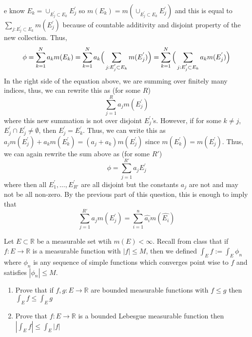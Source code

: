 \documentclass[12pt]{article}
\newcommand{\R}{\mathbb{R}}
\newenvironment{solution}[2][Solution]{\begin{trivlist}
\item[\hskip \labelsep {\bfseries #1}]}{\end{trivlist}}
\newenvironment{problem}[2][Problem]{\begin{trivlist}
\item[\hskip \labelsep {\bfseries #1}\hskip \labelsep {\bfseries #2.}]}{\end{trivlist}}
\begin{document}
\begin{solution}
    We know $E_k = \cup_{E_j^{'}\subset E_k} E_j^{'}$ so $m(E_k) = m(\cup_{E_j^{'}\subset E_k} E_j^{'})$ and this is equal to
    $\sum_{j:E_j^{'}\subset E_k} m(E_j^{'})$ because of countable additivity and disjoint property of the new collection. Thus,
    \[ \phi = \sum_{k=1}^{N} a_km(E_k) = \sum_{k=1}^{N} a_k\Big{(}\sum_{j: E_j^{'}\subset E_k} m(E_j^{'})\Big{)} 
        = \sum_{k=1}^N \Big{(}\sum_{j: E_j^{'}\subset E_k} a_km(E_j^{'})\Big{)}\]
    In the right side of the equation above, we are summing over finitely many indices, thus, we can rewrite this as (for some $R$)
    \[ \sum_{j=1}^R a_jm(E_j^{'}) \]
    where this new summation is not over disjoint $E_j^{'}$'s. However, if for some $k\neq j$, $E_j^{'}\cap E_j^{'}\neq\emptyset$,
    then $E_j^{'} = E_k^{'}$. Thus, we can write this as $a_jm(E_j^{'}) + a_km(E_k^{'}) = (a_j + a_k)m(E_j^{'})$ 
    since $m(E_k^{'}) = m(E_j^{'})$. Thus, we can again rewrite the sum above as (for some $R'$)
    \[ \phi = \sum_{j=1}^{R'} a_jE_j^{'} \]
    where then all $E_1^{'},\hdots,E_{R'}^{'}$ are all disjoint but the constants $a_j$ are not and may not be all non-zero.
    By the previous part of this question, this is enough to imply that
    \[ \sum_{j=1}^{R'} a_jm(E_j^{'}) = \sum_{i=1}^n \hat{a_i}m(\hat{E_i}) \]

\end{solution}
\pagebreak

\begin{problem}{3}
    Let $E\subset\R$ be a measurable set wtih $m(E)<\infty$. Recall from class that if $f:E\to\R$ is a measurable function
    with $|f|\leq M$, then we defined $\int_E f := \int_E \phi_n$ where $\phi_n$ is any sequence of simple functions which
    converges point wise to $f$ and satisfies $|\phi_n|\leq M$.
    
    \begin{enumerate}
        \item Prove that if $f,g:E\to\R$ are bounded measurable functions with $f\leq g$ then $\int_E f\leq \int_E g$
        \item Prove that $f:E\to\R$ is a bounded Lebesgue measurable function then $|\int_E f|\leq \int_E |f|$
    \end{enumerate}
\end{problem}
\end{document}
